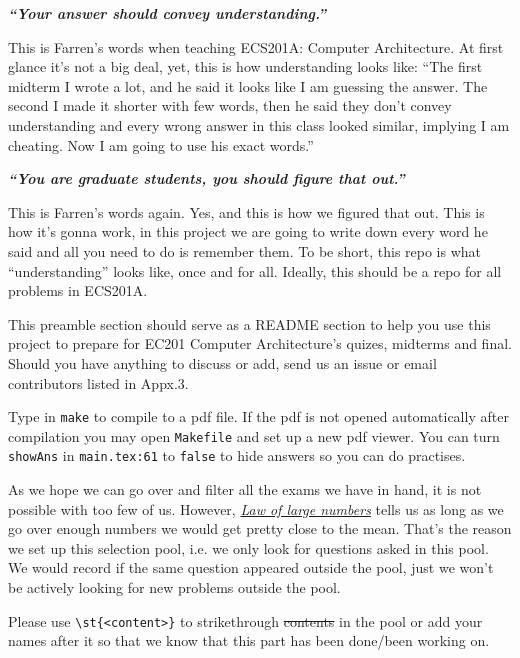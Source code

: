 
\textbf{\textit{``Your answer should convey understanding.''}}

This is Farren's words when teaching ECS201A: Computer Architecture.
At first glance it's not a big deal, yet, this is how understanding looks like: 
``The first midterm I wrote a lot, and he said it looks like I am guessing the answer.
The second I made it shorter with few words, then he said they don't convey understanding and every wrong answer in this class looked similar, implying I am cheating.
Now I am going to use his exact words.''

\textbf{\textit{``You are graduate students, you should figure that out.''}}

This is Farren's words again. 
Yes, and this \name is how we figured that out.
This is how it's gonna work, in this project we are going to write down every word he said and all you need to do is remember them.
To be short, this repo is what ``understanding'' looks like, once and for all.
Ideally, this should be a repo for all problems in ECS201A.

This preamble section should serve as a README section to help you use this project to prepare for EC201 Computer Architecture's quizes, midterms and final.
Should you have anything to discuss or add, send us an issue or email contributors listed in Appx.3.


Type in \lstinline{make} to compile to a pdf file.
If the pdf is not opened automatically after compilation you may open \texttt{Makefile} and set up a new pdf viewer.
You can turn \lstinline{showAns} in \texttt{main.tex:61} to \lstinline{false} to hide answers so you can do practises.


As we hope we can go over and filter all the exams we have in hand, it is not possible with too few of us.
However, \href{https://en.wikipedia.org/wiki/Law_of_large_numbers}{\textit{Law of large numbers}} tells us as long as we go over enough numbers we would get pretty close to the mean.
That's the reason we set up this selection pool, i.e. we only look for questions asked in this pool. 
We would record if the same question appeared outside the pool, just we won't be actively looking for new problems outside the pool.

Please use \lstinline|\st{<content>}| to strikethrough \st{contents} in the pool or add your names after it so that we know that this part has been done/been working on.

